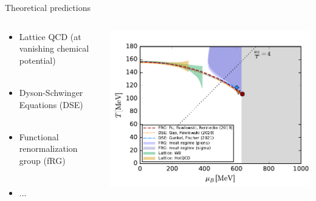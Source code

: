 \begin{frame}[fragile]
\begin{columns}
\begin{column}{0.5\textwidth}
            \vspace{-1.cm}
            \hspace{0.7cm}
            \hspace{1cm}{\scriptsize Nucl.Tech. 46 (2023) 04, 040002-040002}
            \vspace{1cm}
        \end{column}
    \end{columns}
\end{frame}
\begin{frame}[fragile]{Theoretical predictions}
    \begin{columns}
        \begin{column}{0.43\textwidth}
            \vspace{-7cm}
            \begin{itemize}
            \item Lattice QCD (at vanishing chemical potential)\\~\
            \item Dyson-Schwinger Equations (DSE)\\~\
            \item Functional renormalization group (fRG)\\~\
            \item ...
            \end{itemize}
        \end{column}
        \begin{column}{0.5\textwidth}
            \includegraphics[width=1.15\linewidth]{Images/Figures/phasestructure_v4.pdf}
            \vspace{-0.8cm}
            \hspace{0.7cm}
            \hspace{2cm}{\scriptsize QCD phase diagram (fQCD 2025)}
            \vspace{8cm}
        \end{column}
    \end{columns}
\end{frame}
